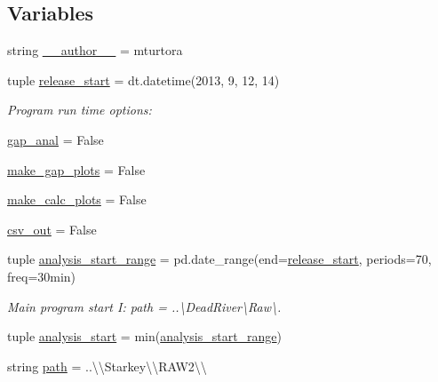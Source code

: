 \subsection*{Variables}
\begin{DoxyCompactItemize}
\item 
string \hyperlink{namespace_date___ranges___concat__script_a50ed371d22d0c321c54a15b48b0f72d7}{\+\_\+\+\_\+author\+\_\+\+\_\+} = \textquotesingle{}mturtora\textquotesingle{}
\item 
tuple \hyperlink{namespace_date___ranges___concat__script_a8d1f404553f799bb9ff6063b634827a3}{release\+\_\+start} = dt.\+datetime(2013, 9, 12, 14)
\begin{DoxyCompactList}\small\item\em Program run time options\+: \end{DoxyCompactList}\item 
\hyperlink{namespace_date___ranges___concat__script_a2be9f688e04252334e2560929ca454e1}{gap\+\_\+anal} = False
\item 
\hyperlink{namespace_date___ranges___concat__script_a8daa59e883d598cddf6265daf73b3368}{make\+\_\+gap\+\_\+plots} = False
\item 
\hyperlink{namespace_date___ranges___concat__script_af9826d87d967e0af51a56f35bb53dbad}{make\+\_\+calc\+\_\+plots} = False
\item 
\hyperlink{namespace_date___ranges___concat__script_aeb5f665fdd491d07f2d8b61e3fe81752}{csv\+\_\+out} = False
\item 
tuple \hyperlink{namespace_date___ranges___concat__script_a0afaa5d03f9354ea68b7437702c1ceb0}{analysis\+\_\+start\+\_\+range} = pd.\+date\+\_\+range(end=\hyperlink{namespace_date___ranges___concat__script_a8d1f404553f799bb9ff6063b634827a3}{release\+\_\+start}, periods=70, freq=\textquotesingle{}30min\textquotesingle{})
\begin{DoxyCompactList}\small\item\em Main program start I\+: path = \textquotesingle{}..\textbackslash{}Dead\+River\textbackslash{}Raw\textbackslash{}\textquotesingle{}. \end{DoxyCompactList}\item 
tuple \hyperlink{namespace_date___ranges___concat__script_a6c0eff6e982e3302358a19994f3da706}{analysis\+\_\+start} = min(\hyperlink{namespace_date___ranges___concat__script_a0afaa5d03f9354ea68b7437702c1ceb0}{analysis\+\_\+start\+\_\+range})
\item 
string \hyperlink{namespace_date___ranges___concat__script_a8333f861dcf7a2c4d8513c76222f5c6a}{path} = \textquotesingle{}..\textbackslash{}\textbackslash{}Starkey\textbackslash{}\textbackslash{}\+R\+A\+W2\textbackslash{}\textbackslash{}\textquotesingle{}

\end{DoxyCompactItemize}
